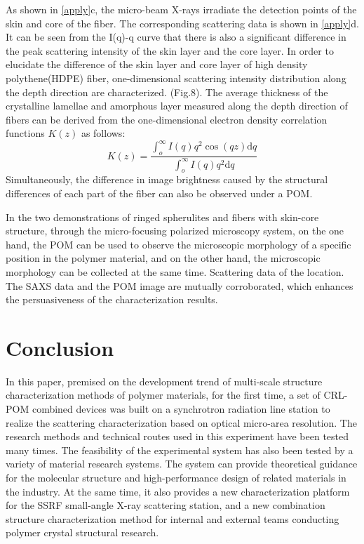 \documentclass{Head}
\begin{document}
As shown in \autoref{apply}c, the micro-beam X-rays irradiate the detection points of the skin and core of the fiber. The corresponding scattering data is shown in \autoref{apply}d.
It can be seen from the I(q)-q curve that there is also a significant difference in the peak scattering intensity of the skin layer and the core layer.
In order to elucidate the difference of the skin layer and core layer of high density polythene(HDPE) fiber, one-dimensional scattering intensity distribution along the depth direction are characterized.
(Fig.8).
The average thickness of the crystalline lamellae and amorphous layer measured along the depth direction of fibers can be derived from the one-dimensional electron density correlation functions $K(z)$ as follows:
\begin{equation}
    K(z)=\frac{\int_o^\infty I(q)q^2 \cos(qz)\mathrm{d}q}{\int_o^\infty I(q)q^2\mathrm{d}q}
\end{equation}
Simultaneously, the difference in image brightness caused by the structural differences of each part of the fiber can also be observed under a POM.


In the two demonstrations of ringed spherulites and fibers with skin-core structure, through the micro-focusing polarized microscopy system, on the one hand, the POM can be used to observe the microscopic morphology of a specific position in the polymer material, and on the other hand, the microscopic morphology can be collected at the same time. Scattering data of the location.
The SAXS data and the POM image are mutually corroborated, which enhances the persuasiveness of the characterization results.
\section{Conclusion}
In this paper, premised on the development trend of multi-scale structure characterization methods of polymer materials, for the first time, a set of CRL-POM combined devices was built on a synchrotron radiation line station to realize the scattering characterization based on optical micro-area resolution. The research methods and technical routes used in this experiment have been tested many times. The feasibility of the experimental system has also been tested by a variety of material research systems. The system can provide theoretical guidance for the molecular structure and high-performance design of related materials in the industry. At the same time, it also provides a new characterization platform for the SSRF small-angle X-ray scattering station, and a new combination structure characterization method for internal and external teams conducting polymer crystal structural research.

\end{document}
